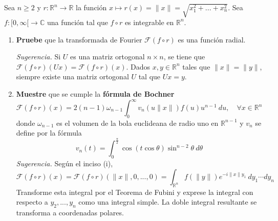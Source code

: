 \documentclass[12pt]{report}
\theoremstyle{largebreak}
\renewcommand{\geq}{\ensuremath{\geqslant}}
\newcommand\cf[3]{\ensuremath{#1:#2\rightarrow#3}}
\newcommand\norm[1]{\ensuremath{\|#1\|}}
\newcommand{\fou}[1]{\ensuremath{\mathcal{F}#1}}
\begin{document}
    \begin{excer}
        Sea $n\geq2$ y $\cf{r}{\mathbb{R}^n}{\mathbb{R}}$ la función $x\mapsto r(x)=\norm{x}=\sqrt{x_1^2+...+x_n^2}$. Sea $\cf{f}{[0,\infty[}{\mathbb{C}}$ una función tal que $f\circ r$ es integrable en $\mathbb{R}^n$.
        \begin{enumerate}
            \item \textbf{Pruebe} que la transformada de Fourier $\fou{(f\circ r)}$ es una función radial.
            
            \textit{Sugerencia.} Si $U$ es una matriz ortogonal $n\times n$, se tiene que $\fou{(f\circ r)}(Ux)=\fou{(f\circ r)}(x)$. Dados $x,y\in\mathbb{R}^n$ tales que $\norm{x}=\norm{y}$, siempre existe una matriz ortogonal $U$ tal que $Ux=y$.

            \item \textbf{Muestre} que se cumple la \textbf{fórmula de Bochner}
            \begin{equation*}
                \fou{(f\circ r)}(x)=2(n-1)\omega_{ n-1}\int_0^\infty v_n(u\norm{x})f(u)u^{ n-1}\:du,\quad\forall x\in\mathbb{R}^n
            \end{equation*}
            donde $\omega_{n-1}$ es el volumen de la bola euclideana de radio uno en $\mathbb{R}^{ n-1}$ y $v_n$ se define por la fórmula
            \begin{equation*}
                v_n(t)=\int_0^{\frac{\pi}{2}}\cos(t\cos\theta)\sin^{ n-2}\theta\:d\theta
            \end{equation*}
            \textit{Sugerencia.} Según el inciso (i),
            \begin{equation*}
                \fou{(f\circ r)}(x)=\fou{(f\circ r)}(\norm{x},0,...,0)=\int_{\mathbb{R}^n}f(\norm{y})e^{ -i\norm{x}y_1}\:dy_1\cdots dy_n
            \end{equation*}
            Transforme esta integral por el Teorema de Fubini y exprese la integral con respecto a $y_2,...,y_n$ como una integral simple. La doble integral resultante se transforma a coordenadas polares.
        \end{enumerate}
    \end{excer}
\end{document}
